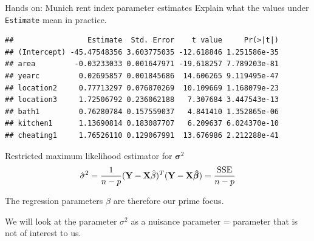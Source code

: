 \documentclass[
  ignorenonframetext,
]{beamer}
\newenvironment{Shaded}{\begin{snugshade}}{\end{snugshade}}
\newcommand{\AttributeTok}[1]{\textcolor[rgb]{0.13,0.29,0.53}{#1}}
\newcommand{\FunctionTok}[1]{\textcolor[rgb]{0.13,0.29,0.53}{\textbf{#1}}}
\newcommand{\NormalTok}[1]{#1}
\newcommand{\OtherTok}[1]{\textcolor[rgb]{0.56,0.35,0.01}{#1}}
\newcommand{\SpecialCharTok}[1]{\textcolor[rgb]{0.81,0.36,0.00}{\textbf{#1}}}
\begin{document}
\begin{frame}[fragile]
\begin{block}{Hands on: Munich rent index parameter estimates}
\protect{}\label{hands-on-munich-rent-index-parameter-estimates}
Explain what the values under \texttt{Estimate} mean in practice.

\begin{Shaded}
\end{Shaded}

\begin{verbatim}
##                 Estimate  Std. Error    t value     Pr(>|t|)
## (Intercept) -45.47548356 3.603775035 -12.618846 1.251586e-35
## area         -0.03233033 0.001647971 -19.618257 7.789203e-81
## yearc         0.02695857 0.001845686  14.606265 9.119495e-47
## location2     0.77713297 0.076870269  10.109669 1.168079e-23
## location3     1.72506792 0.236062188   7.307684 3.447543e-13
## bath1         0.76280784 0.157559037   4.841410 1.352865e-06
## kitchen1      1.13690814 0.183087707   6.209637 6.024370e-10
## cheating1     1.76526110 0.129067991  13.676986 2.212288e-41
\end{verbatim}
\end{block}
\end{frame}

\begin{frame}
\begin{block}{Restricted maximum likelihood estimator for
\({\boldsymbol \sigma}^2\)}
\protect{}\label{restricted-maximum-likelihood-estimator-for-boldsymbol-sigma2}
\[
\hat{\sigma}^2=\frac{1}{n-p} ({\bf Y}-{\bf X}{\hat{\beta}})^T ({\bf Y} - {\bf X}{\boldsymbol{\hat{\beta}}})=\frac{\text{SSE}}{n-p}
\]

The regression parameters \(\beta\) are therefore our prime focus.

We will look at the parameter \(\sigma^2\) as a nuisance parameter =
parameter that is not of interest to us.
\end{block}
\end{frame}
\end{document}
